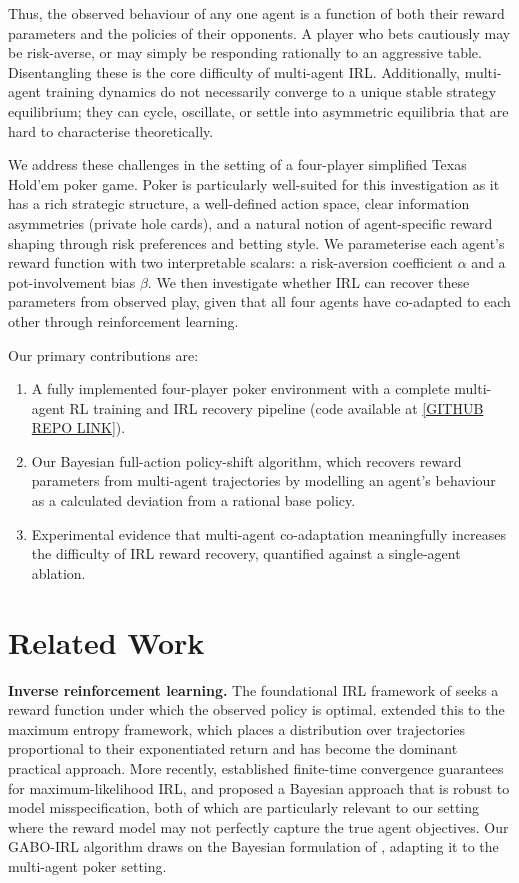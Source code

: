 \documentclass{article}
\begin{document}
Thus, the observed behaviour of any one agent is a function of both their reward parameters and the policies of their opponents. A player who bets cautiously may be risk-averse, or may simply be responding rationally to an aggressive table. Disentangling these is the core difficulty of multi-agent IRL. Additionally, multi-agent training dynamics do not necessarily converge to a unique stable strategy equilibrium; they can cycle, oscillate, or settle into asymmetric equilibria that are hard to characterise theoretically.

We address these challenges in the setting of a four-player simplified Texas Hold'em poker game. Poker is particularly well-suited for this investigation as it has a rich strategic structure, a well-defined action space, clear information asymmetries (private hole cards), and a natural notion of agent-specific reward shaping through risk preferences and betting style. We parameterise each agent's reward function with two interpretable scalars: a risk-aversion coefficient $\alpha$ and a pot-involvement bias $\beta$. We then investigate whether IRL can recover these parameters from observed play, given that all four agents have co-adapted to each other through reinforcement learning.

Our primary contributions are:
\begin{enumerate}
    \item A fully implemented four-player poker environment with a complete multi-agent RL training and IRL recovery pipeline (code available at \url{[GITHUB REPO LINK]}).
    \item Our Bayesian full-action policy-shift algorithm, which recovers reward parameters from multi-agent trajectories by modelling an agent's behaviour as a calculated deviation from a rational base policy.
    \item Experimental evidence that multi-agent co-adaptation meaningfully increases the difficulty of IRL reward recovery, quantified against a single-agent ablation.
\end{enumerate}

\section{Related Work}

\textbf{Inverse reinforcement learning.} The foundational IRL framework of \citet{ng2000algorithms} seeks a reward function under which the observed policy is optimal. \citet{ziebart2008maximum} extended this to the maximum entropy framework, which places a distribution over trajectories proportional to their exponentiated return and has become the dominant practical approach. More recently, \citet{zeng2022maximum} established finite-time convergence guarantees for maximum-likelihood IRL, and \citet{wei2024bayesian} proposed a Bayesian approach that is robust to model misspecification, both of which are particularly relevant to our setting where the reward model may not perfectly capture the true agent objectives. Our GABO-IRL algorithm draws on the Bayesian formulation of \citet{wei2024bayesian}, adapting it to the multi-agent poker setting.
\end{document}
